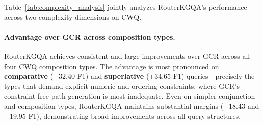 \documentclass[11pt]{article}
\begin{document}
\begin{table}[t]
\centering
\small
\setlength{\tabcolsep}{2.3pt}
\caption{CWQ performance by query complexity (F1, \%). $\Delta$F1 = Full $-$ Stage~1+3 (i.e., the contribution of Stage~2 correction). GCR results are included for cross-method comparison.}
\label{tab:complexity_analysis}
\end{table}

Table~\ref{tab:complexity_analysis} jointly analyzes RouterKGQA's performance across two complexity dimensions on CWQ.

\paragraph{Advantage over GCR across composition types.}
RouterKGQA achieves consistent and large improvements over GCR across all four CWQ composition types. The advantage is most pronounced on \textbf{comparative} (+32.40 F1) and \textbf{superlative} (+34.65 F1) queries---precisely the types that demand explicit numeric and ordering constraints, where GCR's constraint-free path generation is most inadequate. Even on simpler conjunction and composition types, RouterKGQA maintains substantial margins (+18.43 and +19.95 F1), demonstrating broad improvements across all query structures.
\end{document}
